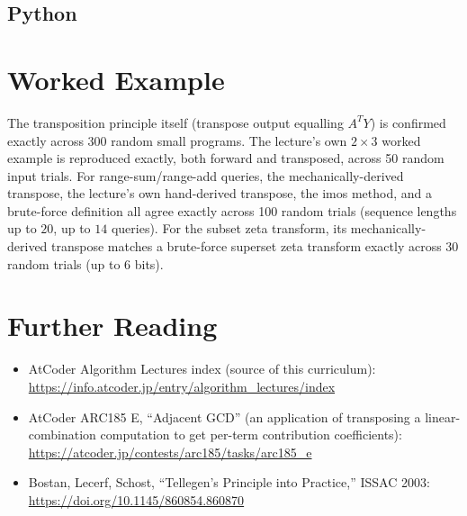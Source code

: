 \documentclass[11pt]{article}
\begin{document}
\subsection{Python}

\section{Worked Example}
\begin{examplebox}
The transposition principle itself (transpose output equalling $A^TY$)
is confirmed exactly across 300 random small programs. The lecture's
own $2\times3$ worked example is reproduced exactly, both forward and
transposed, across 50 random input trials. For range-sum/range-add
queries, the mechanically-derived transpose, the lecture's own
hand-derived transpose, the imos method, and a brute-force definition
all agree exactly across 100 random trials (sequence lengths up to
$20$, up to $14$ queries). For the subset zeta transform, its
mechanically-derived transpose matches a brute-force superset zeta
transform exactly across 30 random trials (up to $6$ bits).
\end{examplebox}

\section{Further Reading}
\begin{itemize}[leftmargin=1.5em]
  \item AtCoder Algorithm Lectures index (source of this curriculum):
        \url{https://info.atcoder.jp/entry/algorithm_lectures/index}
  \item AtCoder ARC185 E, ``Adjacent GCD'' (an application of
        transposing a linear-combination computation to get per-term
        contribution coefficients):
        \url{https://atcoder.jp/contests/arc185/tasks/arc185_e}
  \item Bostan, Lecerf, Schost, ``Tellegen's Principle into Practice,''
        ISSAC 2003:
        \url{https://doi.org/10.1145/860854.860870}
\end{itemize}
\end{document}
